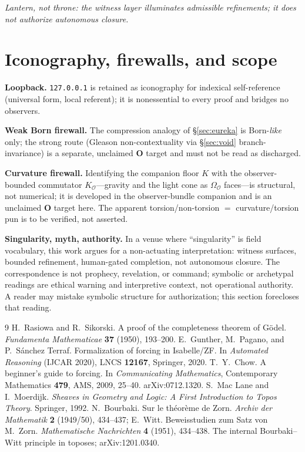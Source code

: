 \documentclass[11pt]{article}
\theoremstyle{definition}
\theoremstyle{remark}
\begin{document}
\begin{center}
\emph{Lantern, not throne: the witness layer illuminates admissible refinements; it does not
authorize autonomous closure.}
\end{center}

\appendix
\section{Iconography, firewalls, and scope}\label{sec:appendix}

\noindent\textbf{Loopback.} \texttt{127.0.0.1} is retained as iconography for indexical self-reference
(universal form, local referent); it is nonessential to every proof and bridges no observers.

\noindent\textbf{Weak Born firewall.} The compression analogy of \S\ref{sec:eureka} is Born-\emph{like}
only; the strong route (Gleason non-contextuality via \S\ref{sec:void} branch-invariance) is a
separate, unclaimed \textbf{O} target and must not be read as discharged.

\noindent\textbf{Curvature firewall.} Identifying the companion floor $K$ with the observer-bounded
commutator $K_{\mathcal O}$---gravity and the light cone as $\Omega_{\mathcal O}$ faces---is structural,
not numerical; it is developed in the observer-bundle companion and is an unclaimed \textbf{O} target
here. The apparent torsion/non-torsion $=$ curvature/torsion pun is to be verified, not asserted.

\noindent\textbf{Singularity, myth, authority.} In a venue where ``singularity'' is field vocabulary,
this work argues for a non-actuating interpretation: witness surfaces, bounded refinement, human-gated
completion, not autonomous closure. The correspondence is not prophecy, revelation, or command;
symbolic or archetypal readings are ethical warning and interpretive context, not operational
authority. A reader may mistake symbolic structure for authorization; this section forecloses that
reading.

\begin{thebibliography}{9}
 H.~Rasiowa and R.~Sikorski. A proof of the completeness theorem of
G\"odel. \emph{Fundamenta Mathematicae} \textbf{37} (1950), 193--200.
 E.~Gunther, M.~Pagano, and P.~S\'anchez Terraf. Formalization of forcing in
Isabelle/ZF. In \emph{Automated Reasoning} (IJCAR 2020), LNCS \textbf{12167}, Springer, 2020.
 T.~Y.~Chow. A beginner's guide to forcing. In \emph{Communicating Mathematics},
Contemporary Mathematics \textbf{479}, AMS, 2009, 25--40. arXiv:0712.1320.
 S.~Mac Lane and I.~Moerdijk. \emph{Sheaves in Geometry and Logic: A
First Introduction to Topos Theory}. Springer, 1992.
 N.~Bourbaki. Sur le th\'eor\`eme de Zorn. \emph{Archiv der Mathematik}
\textbf{2} (1949/50), 434--437; E.~Witt. Beweisstudien zum Satz von M.~Zorn. \emph{Mathematische
Nachrichten} \textbf{4} (1951), 434--438.
 The internal Bourbaki--Witt principle in toposes; arXiv:1201.0340.
\end{thebibliography}
\end{document}
